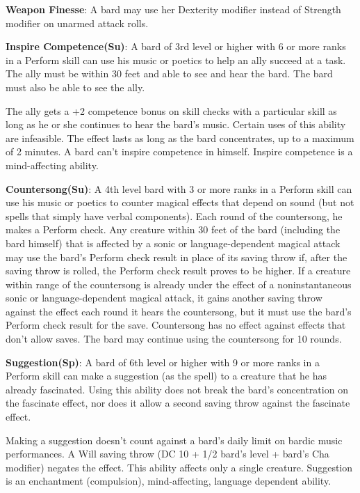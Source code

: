 \textbf{Weapon Finesse}: A bard may use her Dexterity modifier instead of Strength modifier on unarmed attack rolls. 

\textbf{Inspire Competence(Su)}: A bard of 3rd level or higher with 6 or more ranks in a Perform skill can use his music or poetics to help an ally succeed at a task. The ally must be within 30 feet and able to see and hear the bard. The bard must also be able to see the ally.

The ally gets a +2 competence bonus on skill checks with a particular skill as long as he or she continues to hear the bard’s music. Certain uses of this ability are infeasible. The effect lasts as long as the bard concentrates, up to a maximum of 2 minutes. A bard can’t inspire competence in himself. Inspire competence is a mind-affecting ability.

\textbf{Countersong(Su)}: A 4th level bard with 3 or more ranks in a Perform skill can use his music or poetics to counter magical effects that depend on sound (but not spells that simply have verbal components). Each round of the countersong, he makes a Perform check. Any creature within 30 feet of the bard (including the bard himself) that is affected by a sonic or language-dependent magical attack may use the bard’s Perform check result in place of its saving throw if, after the saving throw is rolled, the Perform check result proves to be higher. If a creature within range of the countersong is already under the effect of a noninstantaneous sonic or language-dependent magical attack, it gains another saving throw against the effect each round it hears the countersong, but it must use the bard’s Perform check result for the save. Countersong has no effect against effects that don’t allow saves. The bard may continue using the countersong for 10 rounds.

\textbf{Suggestion(Sp)}: A bard of 6th level or higher with 9 or more ranks in a Perform skill can make a suggestion (as the spell) to a creature that he has already fascinated. Using this ability does not break the bard’s concentration on the fascinate effect, nor does it allow a second saving throw against the fascinate effect.

Making a suggestion doesn’t count against a bard’s daily limit on bardic music performances. A Will saving throw (DC 10 + 1/2 bard’s level + bard’s Cha modifier) negates the effect. This ability affects only a single creature. Suggestion is an enchantment (compulsion), mind-affecting, language dependent ability.